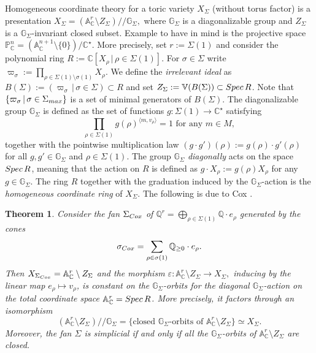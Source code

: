 \documentclass[11pt, reqno]{amsart}
\theoremstyle{plain}
\newtheorem{theorem}{Theorem}[section]
\theoremstyle{definition}
\theoremstyle{remark}
\begin{document}
 Homogeneous coordinate theory for a toric variety $X_{\Sigma}$ (without torus factor)
is a presentation 
$X_{\Sigma}=  (\mathbb{A}_{\mathbb{C}}^{r}\setminus Z_{\Sigma})/\!\!/\mathbb{G}_{\Sigma},$
where $\mathbb{G}_{\Sigma}$ is a diagonalizable group and $Z_{\Sigma}$ is a $\mathbb{G}_{\Sigma}$-invariant closed subset.
Example to have in mind is the projective space $\mathbb{P}^{n}_{\mathbb{C}} =  (\mathbb{A}^{n+1}_{\mathbb{C}}\setminus \{0\})/\mathbb{C}^{\star}$. More precisely,
set $r:= \Sigma(1)$ and consider the polynomial ring $R:= \mathbb{C}[X_{\rho}\,|\, \rho\in\Sigma(1)]$.
For $\sigma\in \Sigma$ write 
$\varpi_{\sigma}:= \prod_{\rho\in \Sigma(1)\setminus \sigma(1)} X_{\rho}.$ We define the \emph{irrelevant ideal} as $B(\Sigma):= (\varpi_{\sigma}\,|\, \sigma\in \Sigma)\subset R$ and set $Z_{\Sigma}:= \mathbb{V}(B(\Sigma))\subset {\rm Spec}\, R$.  Note that $\{\varpi_{\sigma}\, |\, \sigma\in \Sigma_{\rm max}\}$ is a set of minimal generators of $B(\Sigma)$. 
The diagonalizable group $\mathbb{G}_{\Sigma}$ is defined as the set of functions $g:\Sigma(1)\rightarrow \mathbb{C}^{\star}$ satisfying
$$\prod_{\rho\in \Sigma(1)} g(\rho)^{\langle m , v_{\rho}\rangle} =  1\text{ for any } m\in M,$$
together with the pointwise multiplication law $(g\cdot g')(\rho):= g(\rho)\cdot g'(\rho)$ for all $g,g'\in \mathbb{G}_{\Sigma}$
and $\rho\in \Sigma(1)$. The group $\mathbb{G}_{\Sigma}$ \emph{diagonally} acts  on the space ${\rm Spec}\, R$, meaning that the action on $R$ is defined as $g\cdot X_{\rho}:= g(\rho)X_{\rho}$ for any $g\in \mathbb{G}_{\Sigma}$. The ring $R$ together with the graduation induced by the $\mathbb{G}_{\Sigma}$-action is the \emph{homogeneous coordinate ring} of $X_{\Sigma}$. The following is due to Cox \cite{Cox95}. 
\begin{theorem}\label{theo-Cox1} \cite[Theorem 5.1.11]{CLS11}
Consider
the fan $\Sigma_{\rm Cox}$ of $\mathbb{Q}^{r} =  \bigoplus_{\rho\in \Sigma(1)}\mathbb{Q}\cdot e_{\rho}$ generated by the cones
$$ \sigma_{\rm Cox} =  \sum_{\rho\in \sigma(1)} \mathbb{Q}_{\geq 0}\cdot e_{\rho}.$$
Then $X_{\Sigma_{\rm Cox}} =  \mathbb{A}^{r}_{\mathbb{C}}\setminus Z_{\Sigma}$ and the morphism $\varepsilon:  \mathbb{A}^{r}_{\mathbb{C}}\setminus Z_{\Sigma}\rightarrow X_{\Sigma},$ inducing by the linear map $e_{\rho}\mapsto v_{\rho}$,
is constant on the $\mathbb{G}_{\Sigma}$-orbits for the diagonal $\mathbb{G}_{\Sigma}$-action on the total coordinate space 
$\mathbb{A}_{\mathbb{C}}^{r} =  {\rm Spec}\, R$. More precisely, it factors through an isomorphism
$$ (\mathbb{A}_{\mathbb{C}}^{r}\setminus Z_{\Sigma})/\!\!/\mathbb{G}_{\Sigma} = \{\text{closed } \mathbb{G}_{\Sigma}\text{-orbits of }\mathbb{A}_{\mathbb{C}}^{r}\setminus Z_{\Sigma}\}\simeq X_{\Sigma}.$$
Moreover, the fan $\Sigma$ is simplicial if and only if all the $\mathbb{G}_{\Sigma}$-orbits of $\mathbb{A}^{r}_{\mathbb{C}}\setminus Z_{\Sigma}$ are closed. 
\end{theorem}
\end{document}
